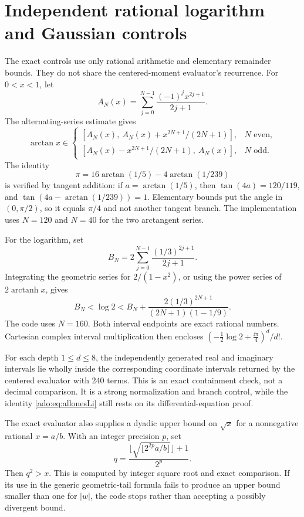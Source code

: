 \section{Independent rational logarithm and Gaussian controls}
\label{ado:app:controls}
The exact controls use only rational arithmetic and elementary remainder
bounds. They do not share the centered-moment evaluator's recurrence.
For $0<x<1$, let
\[
 A_N(x)=\sum_{j=0}^{N-1}\frac{(-1)^jx^{2j+1}}{2j+1}.
\]
The alternating-series estimate gives
\[
 \arctan x\in
 \begin{cases}
 [A_N(x),\ A_N(x)+x^{2N+1}/(2N+1)],&N\text{ even},\\
 [A_N(x)-x^{2N+1}/(2N+1),\ A_N(x)],&N\text{ odd}.
 \end{cases}
\]
The identity
\begin{equation}\label{ado:eq:machin}
 \pi=16\arctan(1/5)-4\arctan(1/239)
\end{equation}
is verified by tangent addition: if $a=\arctan(1/5)$, then
$\tan(4a)=120/119$, and
$\tan(4a-\arctan(1/239))=1$. Elementary bounds put the angle in
$(0,\pi/2)$, so it equals $\pi/4$ and not another tangent branch.
The implementation uses $N=120$ and $N=40$ for the two arctangent
series.

For the logarithm, set
\[
 B_N=2\sum_{j=0}^{N-1}\frac{(1/3)^{2j+1}}{2j+1}.
\]
Integrating the geometric series for $2/(1-x^2)$, or using the
power series of $2\operatorname{arctanh}x$, gives
\begin{equation}\label{ado:eq:log2interval}
 B_N<\log2<
 B_N+\frac{2(1/3)^{2N+1}}{(2N+1)(1-1/9)}.
\end{equation}
The code uses $N=160$. Both interval endpoints are exact rational
numbers. Cartesian complex interval multiplication then encloses
$(-\tfrac12\log2+\tfrac{\ii\pi}{4})^d/d!$.

For each depth $1\le d\le8$, the independently generated real and
imaginary intervals lie wholly inside the corresponding coordinate
intervals returned by the centered evaluator with 240 terms. This is
an exact containment check, not a decimal comparison. It is a strong
normalization and branch control, while the identity
\eqref{ado:eq:allonesLi} still rests on its differential-equation proof.

The exact evaluator also supplies a dyadic upper bound on $\sqrt{x}$
for a nonnegative rational $x=a/b$. With an integer precision $p$, set
\[
 q=\frac{\lfloor\sqrt{\lfloor 2^{2p}a/b\rfloor}\rfloor+1}{2^p}.
\]
Then $q^2>x$. This is computed by integer square root and exact
comparison. If its use in the generic geometric-tail formula fails to
produce an upper bound smaller than one for $|w|$, the code stops
rather than accepting a possibly divergent bound.
